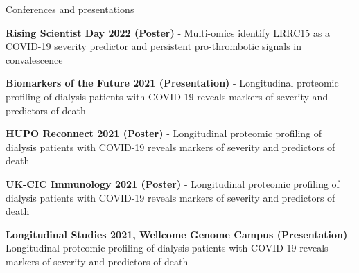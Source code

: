 \documentclass{resume}
\begin{document}
\begin{rSection}{Conferences and presentations}

\item \textbf{Rising Scientist Day 2022 (Poster)} - Multi-omics identify LRRC15 as a COVID-19 severity predictor and persistent pro-thrombotic signals in convalescence
\vspace{3pt plus 1pt minus 1pt}

\item \textbf{Biomarkers of the Future 2021 (Presentation)} - Longitudinal proteomic profiling of dialysis patients with COVID-19 reveals markers of severity and predictors of death
\vspace{3pt plus 1pt minus 1pt}

\item \textbf{HUPO Reconnect 2021 (Poster)} - Longitudinal proteomic profiling of dialysis patients with COVID-19 reveals markers of severity and predictors of death
\vspace{3pt plus 1pt minus 1pt}

\item \textbf{UK-CIC Immunology 2021 (Poster)} - Longitudinal proteomic profiling of dialysis patients with COVID-19 reveals markers of severity and predictors of death
\vspace{3pt plus 1pt minus 1pt}

\item \textbf{Longitudinal Studies 2021, Wellcome Genome Campus (Presentation)} - Longitudinal proteomic profiling of dialysis patients with COVID-19 reveals markers of severity and predictors of death

\end{rSection}
\end{document}
